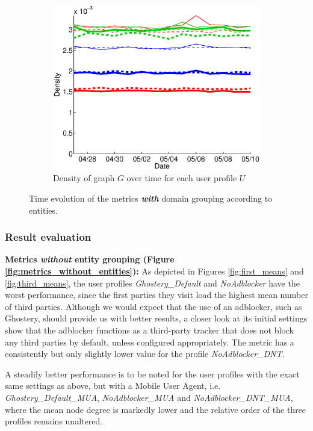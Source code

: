\documentclass{sig-alternate}
\begin{document}
\begin{figure}
  \begin{subfigure}{.45\textwidth}
    \includegraphics[width=\textwidth]{figures/plots/density-entities.eps}
    \caption{Density of graph $G$ over time for each user profile $U$}
    \label{fig:density_entities}
  \end{subfigure}
  \caption{Time evolution of the metrics \textbf{\textit{with}} domain grouping according to entities.}
  \label{fig:metrics_with_entities}
  \end{figure}

\subsubsection{Result evaluation}

\textbf{Metrics \textit{without} entity grouping (Figure \ref{fig:metrics_without_entities}):} As depicted in Figures \ref{fig:first_means} and \ref{fig:third_means}, the user profiles \textit{Ghostery\_Default} and \textit{NoAdblocker} have the worst performance, since the first parties they visit load the highest mean number of third parties. Although we would expect that the use of an adblocker, such as Ghostery, should provide us with better results, a closer look at its initial settings show that the adblocker functions as a third-party tracker that does not block any third parties by default, unless configured appropriately. The metric has a consistently but only slightly lower value for the profile \textit{NoAdblocker\_DNT}.

A steadily better performance is to be noted for the user profiles with the exact same settings as above, but with a Mobile User Agent, i.e. \textit{Ghostery\_Default\_MUA}, \textit{NoAdblocker\_MUA} and \textit{NoAdblocker\_DNT\_MUA}, where the mean node degree is markedly lower and the relative order of the three profiles remains unaltered.
\end{document}
